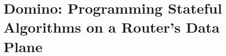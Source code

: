 \chapter{Domino: Programming Stateful Algorithms on a Router's Data Plane}
\label{chap:domino}







